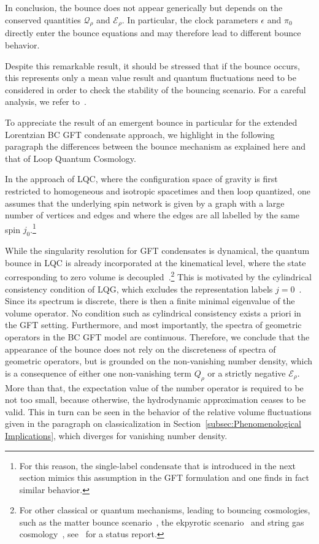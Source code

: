 \documentclass[11pt,a4paper]{article}
\begin{document}
In conclusion, the bounce does not appear generically but depends on the conserved quantities $\mathcal{Q}_{\rho}$ and $\mathcal{E}_{\rho}$. In particular, the clock parameters $\epsilon$ and $\pi_0$ directly enter the bounce equations and may therefore lead to different bounce behavior. 

Despite this remarkable result, it should be stressed that if the bounce occurs, this represents only a mean value result and quantum fluctuations need to be considered in order to check the stability of the bouncing scenario. For a careful analysis, we refer to~\cite{Marchetti:2020qsq}.

To appreciate the result of an emergent bounce in particular for the extended Lorentzian BC GFT condensate approach, we highlight in the following paragraph the differences between the bounce mechanism as explained here and that of Loop Quantum Cosmology.

In the approach of LQC, where the configuration space of gravity is first restricted to homogeneous and isotropic spacetimes and then loop quantized, one assumes that the underlying spin network is given by a graph with a large number of vertices and edges and where the edges are all labelled by the same spin $j_0$.\footnote{For this reason, the single-label condensate that is introduced in the next section mimics this assumption in the GFT formulation and one finds in fact similar behavior.}

While the singularity resolution for GFT condensates is dynamical, the quantum bounce in LQC is already incorporated at the kinematical level, where the state corresponding to zero volume is decoupled~\cite{Banerjee:2011qu}.\footnote{For other classical or quantum mechanisms, leading to bouncing cosmologies, such as the matter bounce scenario~\cite{Finelli:2001sr,Cai:2014jla,Cai:2015vzv}, the ekpyrotic scenario~\cite{Khoury:2001wf} and string gas cosmology~\cite{Brandenberger1989,Brandenberger:2007zza}, see~\cite{Brandenberger:2016vhg} for a status report.} This is motivated by the cylindrical consistency condition of LQG, which excludes the representation labels $j=0$~\cite{Thiemann2007a}. Since its spectrum is discrete, there is then a finite minimal eigenvalue of the volume operator. No condition such as cylindrical consistency exists a priori in the GFT setting. Furthermore, and most importantly, the spectra of geometric operators in the BC GFT model are continuous. Therefore, we conclude that the appearance of the bounce does not rely on the discreteness of spectra of geometric operators, but is grounded on the non-vanishing number density, which is a consequence of either one non-vanishing term $Q_{\rho}$ or a strictly negative $\mathcal{E}_{\rho}$. More than that, the expectation value of the number operator is required to be not too small, because otherwise, the hydrodynamic approximation ceases to be valid. This in turn can be seen in the behavior of the relative volume fluctuations given in the paragraph on classicalization in Section~\ref{subsec:Phenomenological Implications}, which diverges for vanishing number density.
\end{document}
